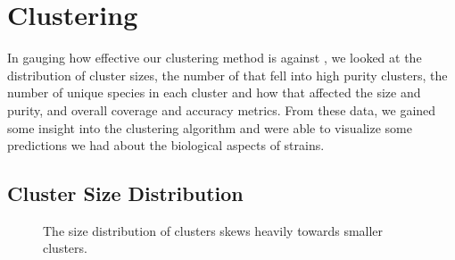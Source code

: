 \section{Clustering}\label{sec:results:clustering}
In gauging how effective our clustering method is against \cplop{}, we looked at the distribution of cluster sizes, the number of \isols{} that fell into high purity clusters, the number of unique species in each cluster and how that affected the size and purity, and overall coverage and accuracy metrics.
From these data, we gained some insight into the clustering algorithm and were able to visualize some predictions we had about the biological aspects of strains.  

\subsection{Cluster Size Distribution}
\begin{figure}
    \centering
    \hfill
    \hfill
    \caption{The size distribution of clusters skews heavily towards smaller clusters.}
    \label{fig:clust_size_dist}
\end{figure}


